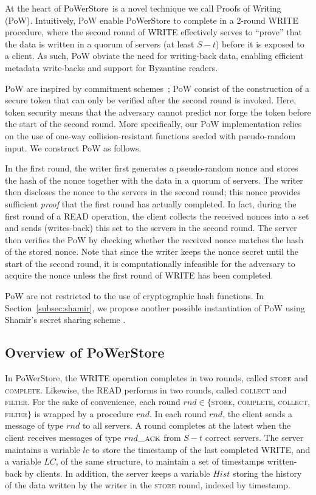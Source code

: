\documentclass[10pt,conference,compsocconf]{IEEEtran}
\newcommand{\protocol}{PoWerStore}
\newcommand{\complete}{\textsc{complete}}
\begin{document}
At the heart of \protocol\ is a novel technique we call Proofs of Writing (PoW). Intuitively, PoW enable \protocol{} to complete in a 2-round \textsc{WRITE} procedure, where the second round of \textsc{WRITE} effectively serves to ``prove'' that the data is written in a quorum of servers (at least $S-t$) before it is exposed to a client. As such, PoW obviate the need for writing-back data, enabling efficient metadata write-backs and support for Byzantine readers.

PoW are inspired by commitment schemes~\cite{Halevi1996}; PoW consist of the construction of a secure token that can only be verified after the second round is invoked. Here, token security means that the adversary cannot predict nor forge the token before the start of the second round.
More specifically, our PoW implementation relies on the use of one-way collision-resistant functions seeded with pseudo-random input. We construct PoW as follows.

In the first round, the writer first generates a pseudo-random nonce and stores the hash of the nonce together with the data in a quorum of servers. The writer then discloses the nonce to the servers in the second round; this nonce provides sufficient \emph{proof} that the first round has actually completed. In fact, during the first round of a \textsc{READ} operation, the client collects the received nonces into a set and sends (writes-back) this set to the servers in the second round. The server then verifies the PoW by checking whether the received nonce matches the hash of the stored nonce. Note that since the writer keeps the nonce secret until the start of the second round, it is computationally infeasible for the adversary to acquire the nonce unless the first round of \textsc{WRITE} has been completed.

PoW are not restricted to the use of cryptographic hash functions. In Section~\ref{subsec:shamir}, we propose another possible instantiation of PoW using Shamir's secret sharing scheme \cite{Sha79}.

\subsection{Overview of \protocol}

In \protocol, the \textsc{WRITE} operation completes in two rounds, called \textsc{store} and \textsc{\complete}. Likewise, the \textsc{READ} performs in two rounds, called \textsc{collect} and \textsc{filter}. For the sake of convenience, each round $rnd \in \{$\textsc{store}, \textsc{\complete}, \textsc{collect}, \textsc{filter}$\}$ is wrapped by a procedure $rnd$. In each round $rnd$, the client sends a message of type $rnd$ to all servers. A round completes at the latest when the client receives messages of type $rnd\textsc{\_ack}$ from $S-t$ correct servers. The server maintains a variable $lc$ to store the timestamp of the last completed \textsc{WRITE}, and a variable $LC$, of the same structure, to maintain a set of timestamps written-back by clients. In addition, the server keeps a variable $Hist$ storing the history of the data written by the writer in the \textsc{store} round, indexed by timestamp.
\end{document}
